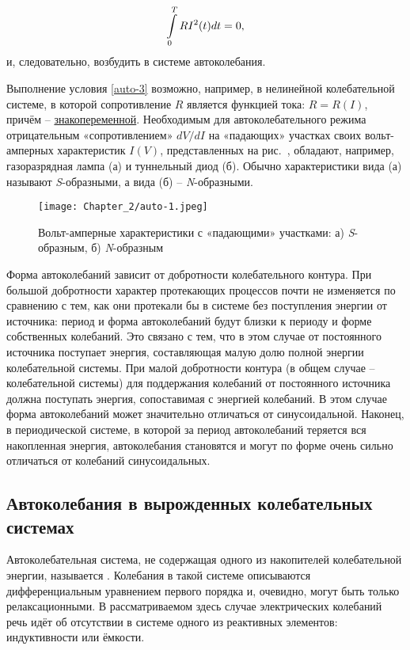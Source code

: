 \begin{equation}
	\eqmark{auto-3}
	\int\limits_{0}^{T}{R{{I}^{2}}(t)dt}=0,
\end{equation}
и, следовательно, возбудить в системе автоколебания.

Выполнение условия \eqref{auto-3} возможно, например, в {нелинейной} колебательной системе, в которой сопротивление $R$ является функцией тока: $R=R(I)$, причём -- \underline{знакопеременной}. Необходимым для
автоколебательного режима отрицательным «сопротивлением» ${dV}/{dI}$ на «падающих» участках своих вольт-амперных характеристик $I(V)$, представленных на рис.~, обладают, например, газоразрядная лампа (а) и туннельный диод (б). Обычно характеристики вида (а) называют \emph{S}-образными, а вида (б) -- \emph{N}-образными.

\begin{figure}
	\centering
	\texttt{[image: Chapter\_2/auto-1.jpeg]}
	\caption{Вольт-амперные характеристики с «падающими» участками:	а) \emph{S}-образным, б) \emph{N}-образным}
\end{figure}


Форма автоколебаний зависит от добротности колебательного контура. При большой добротности характер протекающих процессов почти не изменяется по сравнению с тем, как они протекали бы в системе без поступления
энергии от источника: период и форма автоколебаний будут близки к периоду и форме собственных колебаний. Это связано с тем, что в этом случае от постоянного источника поступает энергия, составляющая малую
долю полной энергии колебательной системы. При малой добротности контура (в общем случае -- колебательной системы) для поддержания колебаний от постоянного источника должна поступать энергия, сопоставимая с энергией колебаний. В этом случае форма автоколебаний может значительно отличаться от синусоидальной. Наконец, в периодической системе, в которой за период автоколебаний теряется вся накопленная энергия, автоколебания становятся  и могут по форме очень сильно отличаться от колебаний синусоидальных.

\subsection{Автоколебания в вырожденных колебательных системах}
Автоколебательная система, не содержащая одного из накопителей колебательной энергии, называется . Колебания в такой системе описываются дифференциальным уравнением первого порядка и, очевидно, могут быть только релаксационными. В рассматриваемом здесь случае электрических колебаний речь идёт об отсутствии в системе одного из реактивных элементов: индуктивности или ёмкости.

